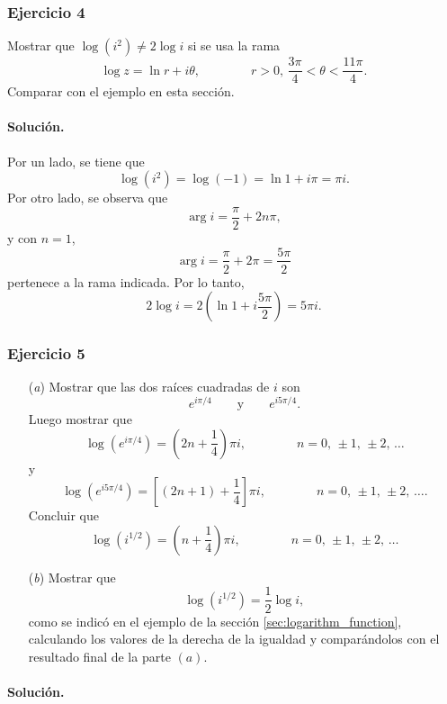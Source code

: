 \documentclass[a4paper]{report}
\begin{document}
\subsubsection{Ejercicio 4}

Mostrar que \(\log(i^2)\neq2\log i\) si se usa la rama
\[
 \log z=\ln r+i\theta,\qquad\qquad 
 r>0,\,\frac{3\pi}{4}<\theta<\frac{11\pi}{4}.
\]
Comparar con el ejemplo en esta sección.

\paragraph{Solución.} Por un lado, se tiene que 
\[
 \log(i^2)=\log(-1)=\ln1+i\pi=\pi i.
\]
Por otro lado, se observa que
\[
 \arg i=\frac{\pi}{2}+2n\pi,
\]
y con \(n=1\),
\[
 \arg i=\frac{\pi}{2}+2\pi=\frac{5\pi}{2}
\]
pertenece a la rama indicada. Por lo tanto,
\[
 2\log i=2\left(\ln1+i\frac{5\pi}{2}\right)=5\pi i.
\]

\subsubsection{Ejercicio 5}

\begin{enumerate}
 \item[(\textit{a})] Mostrar que las dos raíces cuadradas de \(i\) son
 \[
  e^{i\pi/4}
  \qquad\textrm{y}\qquad
  e^{i5\pi/4}.
 \]
 Luego mostrar que 
 \[
  \log(e^{i\pi/4})=\left(2n+\frac{1}{4}\right)\pi i,\qquad\qquad n=0,\,\pm1,\,\pm2,\,\dots
 \]
 y
 \[
  \log(e^{i5\pi/4})=\left[(2n+1)+\frac{1}{4}\right]\pi i,\qquad\qquad n=0,\,\pm1,\,\pm2,\,\dots.
 \]
 Concluir que 
 \[
  \log(i^{1/2})=\left(n+\frac{1}{4}\right)\pi i,\qquad\qquad n=0,\,\pm1,\,\pm2,\,\dots
 \]
 \item[(\textit{b})] Mostrar que 
 \[
  \log(i^{1/2})=\frac{1}{2}\log i,
 \]
 como se indicó en el ejemplo de la sección \ref{sec:logarithm_function}, calculando los valores de la derecha de la igualdad y comparándolos con el resultado final de la parte \((a)\). 
\end{enumerate} 

\paragraph{Solución.} 
\end{document}
